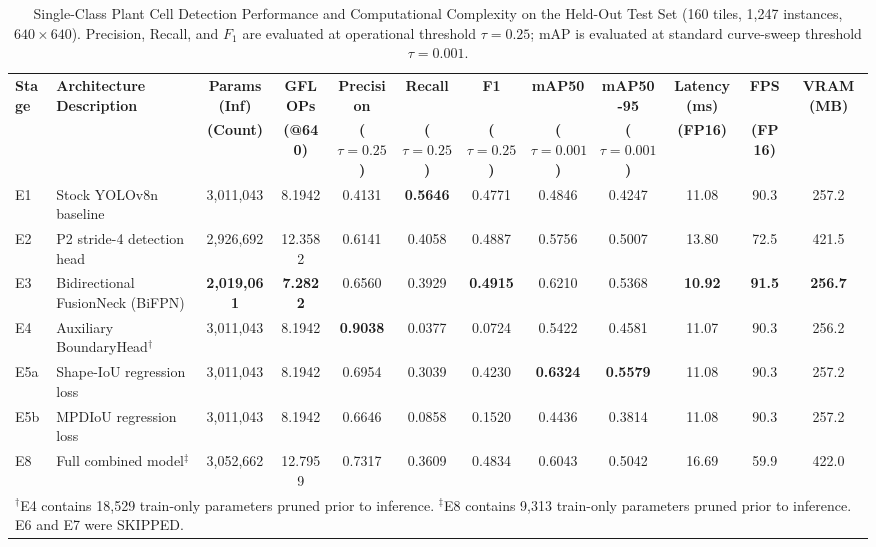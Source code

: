 \documentclass[conference]{IEEEtran}
\begin{document}
\begin{table}[t]
\centering
\caption{Single-Class Plant Cell Detection Performance and Computational Complexity on the Held-Out Test Set (160 tiles, 1,247 instances, $640 \times 640$). Precision, Recall, and $F_1$ are evaluated at operational threshold $\tau=0.25$; mAP is evaluated at standard curve-sweep threshold $\tau=0.001$.}
\label{tab:master_results}
\small
\begin{tabular}{llcccccccccc}
\toprule
\textbf{Stage} & \textbf{Architecture Description} & \textbf{Params (Inf)} & \textbf{GFLOPs} & \textbf{Precision} & \textbf{Recall} & \textbf{F1} & \textbf{mAP50} & \textbf{mAP50-95} & \textbf{Latency (ms)} & \textbf{FPS} & \textbf{VRAM (MB)} \\
 & & \textbf{(Count)} & \textbf{(@640)} & \textbf{($\tau=0.25$)} & \textbf{($\tau=0.25$)} & \textbf{($\tau=0.25$)} & \textbf{($\tau=0.001$)} & \textbf{($\tau=0.001$)} & \textbf{(FP16)} & \textbf{(FP16)} & \\
\midrule
E1 & Stock YOLOv8n baseline & 3,011,043 & 8.1942 & 0.4131 & \textbf{0.5646} & 0.4771 & 0.4846 & 0.4247 & 11.08 & 90.3 & 257.2 \\
E2 & P2 stride-4 detection head & 2,926,692 & 12.3582 & 0.6141 & 0.4058 & 0.4887 & 0.5756 & 0.5007 & 13.80 & 72.5 & 421.5 \\
E3 & Bidirectional FusionNeck (BiFPN) & \textbf{2,019,061} & \textbf{7.2822} & 0.6560 & 0.3929 & \textbf{0.4915} & 0.6210 & 0.5368 & \textbf{10.92} & \textbf{91.5} & \textbf{256.7} \\
E4 & Auxiliary BoundaryHead$^{\dagger}$ & 3,011,043 & 8.1942 & \textbf{0.9038} & 0.0377 & 0.0724 & 0.5422 & 0.4581 & 11.07 & 90.3 & 256.2 \\
E5a & Shape-IoU regression loss & 3,011,043 & 8.1942 & 0.6954 & 0.3039 & 0.4230 & \textbf{0.6324} & \textbf{0.5579} & 11.08 & 90.3 & 257.2 \\
E5b & MPDIoU regression loss & 3,011,043 & 8.1942 & 0.6646 & 0.0858 & 0.1520 & 0.4436 & 0.3814 & 11.08 & 90.3 & 257.2 \\
E8 & Full combined model$^{\ddagger}$ & 3,052,662 & 12.7959 & 0.7317 & 0.3609 & 0.4834 & 0.6043 & 0.5042 & 16.69 & 59.9 & 422.0 \\
\bottomrule
\multicolumn{12}{l}{\footnotesize $^{\dagger}$E4 contains 18,529 train-only parameters pruned prior to inference. $^{\ddagger}$E8 contains 9,313 train-only parameters pruned prior to inference. E6 and E7 were SKIPPED.}
\end{tabular}
\end{table}
\end{document}
